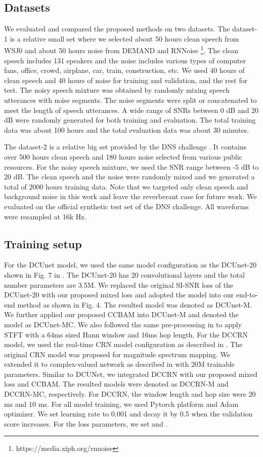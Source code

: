 \documentclass{article}
\begin{document}
\subsection{Datasets}
We evaluated and compared the proposed methods on two datasets. The dataset-1 is a relative small set where we selected about 50 hours clean speech from WSJ0 \cite{Garofolo1993} and about 50 hours noise from DEMAND \cite{Thiemann2013} and  RNNoise \footnote{https://media.xiph.org/rnnoise}. The clean speech includes 131 speakers and the noise includes various types of computer fans, office, crowd, airplane, car, train, construction, etc. We used 40 hours of clean speech and 40 hours of noise for training and validation, and the rest for test. The noisy speech mixture was obtained by randomly mixing speech utterances with noise segments. The noise segments were split or concatenated to meet the length of speech utterances. A wide range of SNRs between 0 dB and 20 dB were randomly generated for both training and evaluation. The total training data was about 100 hours and the total evaluation data was about 30 minutes.

The dataset-2 is a relative big set provided by the DNS challenge \cite{Reddy2020}. It contains over 500 hours clean speech and 180 hours noise selected from various public resources. For the noisy speech mixture, we used the SNR range between -5 dB to 20 dB. The clean speech and the noise were randomly mixed and we generated a total of 2000 hours training data. Note that we targeted only clean speech and background noise in this work and leave the reverberant case for future work. We evaluated on the official synthetic test set of the DNS challenge. All waveforms were resampled at 16k Hz.
\subsection{Training setup}
For the DCUnet model, we used the same model configuration as the DCUnet-20 shown in Fig. 7 in \cite{Choi2019}. The DCUnet-20 has 20 convolutional layers and the total number parameters are 3.5M. We replaced the original SI-SNR loss of the DCUnet-20 with our proposed mixed loss and adopted the model into our end-to-end method as shown in Fig. 4. The resulted model was denoted as DCUnet-M. We further applied our proposed CCBAM into DCUnet-M and denoted the model as DCUnet-MC. We also followed the same pre-processing in \cite{Choi2019} to apply STFT with a 64ms sized Hann window and 16ms hop length. For the DCCRN model, we used the real-time CRN model configuration as described in \cite{Tan2018}. The original CRN model was proposed for magnitude spectrum mapping. We extended it to complex-valued network as described in \cite{Hu2020} with 20M trainable parameters. Similar to DCUNet, we integrated DCCRN with our proposed mixed loss and CCBAM. The resulted models were denoted as DCCRN-M and DCCRN-MC, respectively. For DCCRN, the window length and hop size were 20 ms and 10 ms. For all model training, we used Pytorch platform and Adam optimizer. We set learning rate to 0.001 and decay it by 0.5 when the validation score increases. For the loss parameters, we set  and .
\end{document}
